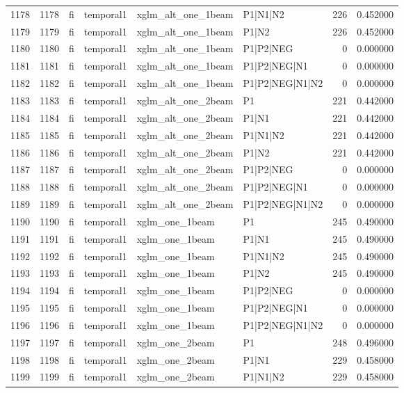 \begin{tabular}{lrllllrr}
1178 & 1178 & fi & temporal1 & xglm_alt_one_1beam & P1|N1|N2 & 226 & 0.452000 \\
1179 & 1179 & fi & temporal1 & xglm_alt_one_1beam & P1|N2 & 226 & 0.452000 \\
1180 & 1180 & fi & temporal1 & xglm_alt_one_1beam & P1|P2|NEG & 0 & 0.000000 \\
1181 & 1181 & fi & temporal1 & xglm_alt_one_1beam & P1|P2|NEG|N1 & 0 & 0.000000 \\
1182 & 1182 & fi & temporal1 & xglm_alt_one_1beam & P1|P2|NEG|N1|N2 & 0 & 0.000000 \\
1183 & 1183 & fi & temporal1 & xglm_alt_one_2beam & P1 & 221 & 0.442000 \\
1184 & 1184 & fi & temporal1 & xglm_alt_one_2beam & P1|N1 & 221 & 0.442000 \\
1185 & 1185 & fi & temporal1 & xglm_alt_one_2beam & P1|N1|N2 & 221 & 0.442000 \\
1186 & 1186 & fi & temporal1 & xglm_alt_one_2beam & P1|N2 & 221 & 0.442000 \\
1187 & 1187 & fi & temporal1 & xglm_alt_one_2beam & P1|P2|NEG & 0 & 0.000000 \\
1188 & 1188 & fi & temporal1 & xglm_alt_one_2beam & P1|P2|NEG|N1 & 0 & 0.000000 \\
1189 & 1189 & fi & temporal1 & xglm_alt_one_2beam & P1|P2|NEG|N1|N2 & 0 & 0.000000 \\
1190 & 1190 & fi & temporal1 & xglm_one_1beam & P1 & 245 & 0.490000 \\
1191 & 1191 & fi & temporal1 & xglm_one_1beam & P1|N1 & 245 & 0.490000 \\
1192 & 1192 & fi & temporal1 & xglm_one_1beam & P1|N1|N2 & 245 & 0.490000 \\
1193 & 1193 & fi & temporal1 & xglm_one_1beam & P1|N2 & 245 & 0.490000 \\
1194 & 1194 & fi & temporal1 & xglm_one_1beam & P1|P2|NEG & 0 & 0.000000 \\
1195 & 1195 & fi & temporal1 & xglm_one_1beam & P1|P2|NEG|N1 & 0 & 0.000000 \\
1196 & 1196 & fi & temporal1 & xglm_one_1beam & P1|P2|NEG|N1|N2 & 0 & 0.000000 \\
1197 & 1197 & fi & temporal1 & xglm_one_2beam & P1 & 248 & 0.496000 \\
1198 & 1198 & fi & temporal1 & xglm_one_2beam & P1|N1 & 229 & 0.458000 \\
1199 & 1199 & fi & temporal1 & xglm_one_2beam & P1|N1|N2 & 229 & 0.458000 \\

\end{tabular}
